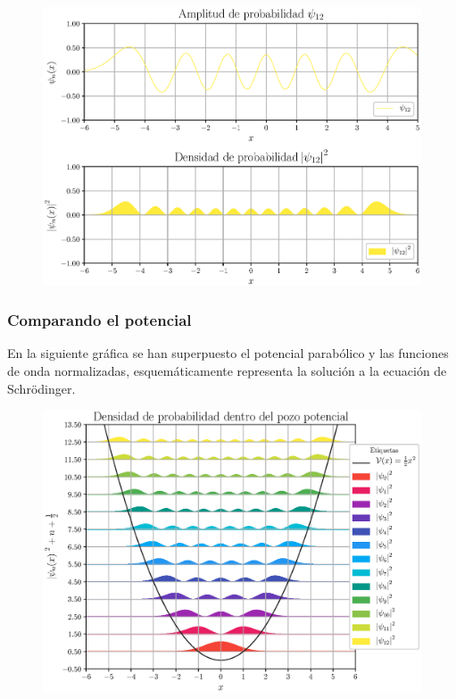\documentclass[12pt]{beamer}
\begin{document}
\begin{frame}[plain]
\begin{figure}[H]
    \centering
    \includegraphics[scale=0.5]{Imagenes/Funcion_Onda_012.eps}
\end{figure}
\end{frame}
\begin{frame}
\frametitle{Comparando el potencial}
En la siguiente gráfica se han superpuesto el potencial parabólico y las funciones de onda normalizadas, esquemáticamente representa la solución a la ecuación de Schrödinger.
\end{frame}
\begin{frame}[plain]
\begin{figure}[H]
    \centering
    \includegraphics[scale=0.55]{Imagenes/Funciones_Normalizadas_01.eps}
\end{figure}
\end{frame}
\end{document}
